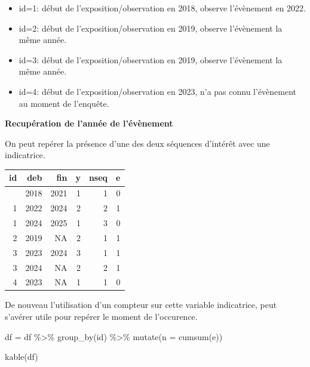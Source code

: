 \documentclass[
  12pt,
  letterpaper,
  DIV=11,
  numbers=noendperiod,
  onepage,
  openany]{scrreprt}
\newenvironment{Shaded}{\begin{snugshade}}{\end{snugshade}}
\newcommand{\AttributeTok}[1]{\textcolor[rgb]{0.80,0.80,0.80}{#1}}
\newcommand{\DecValTok}[1]{\textcolor[rgb]{0.86,0.86,0.80}{#1}}
\newcommand{\FunctionTok}[1]{\textcolor[rgb]{0.94,0.94,0.56}{#1}}
\newcommand{\NormalTok}[1]{\textcolor[rgb]{0.80,0.80,0.80}{#1}}
\newcommand{\OtherTok}[1]{\textcolor[rgb]{0.94,0.94,0.56}{#1}}
\newcommand{\SpecialCharTok}[1]{\textcolor[rgb]{0.86,0.64,0.64}{#1}}
\providecommand{\tightlist}{%
  \setlength{\itemsep}{0pt}\setlength{\parskip}{0pt}}\usepackage{longtable,booktabs,array}
\begin{document}
\begin{itemize}
\tightlist
\item
  id=1: début de l'exposition/observation en 2018, observe l'évènement
  en 2022.
\item
  id=2: début de l'exposition/observation en 2019, observe l'évènement
  la même année.
\item
  id=3: début de l'exposition/observation en 2019, observe l'évènement
  la même année.
\item
  id=4: début de l'exposition/observation en 2023, n'a pas connu
  l'évènement au moment de l'enquête.
\end{itemize}

\textbf{Recupération de l'année de l'évènement}

On peut repérer la présence d'une des deux séquences d'intérêt avec une
indicatrice.

\begin{Shaded}
\end{Shaded}

\begin{longtable}[]{@{}rrrrrr@{}}
\toprule\noalign{}
id & deb & fin & y & nseq & e \\
\midrule\noalign{}
\endhead
\bottomrule\noalign{}
\endlastfoot
1 & 2018 & 2021 & 1 & 1 & 0 \\
1 & 2022 & 2024 & 2 & 2 & 1 \\
1 & 2024 & 2025 & 1 & 3 & 0 \\
2 & 2019 & NA & 2 & 1 & 1 \\
3 & 2023 & 2024 & 3 & 1 & 1 \\
3 & 2024 & NA & 2 & 2 & 1 \\
4 & 2023 & NA & 1 & 1 & 0 \\
\end{longtable}

De nouveau l'utilisation d'un compteur sur cette variable indicatrice,
peut s'avérer utile pour repérer le moment de l'occurence.

\begin{Shaded}
\begin{Highlighting}[]
\NormalTok{df }\OtherTok{=}\NormalTok{ df }\SpecialCharTok{\%\textgreater{}\%} \FunctionTok{group\_by}\NormalTok{(id) }\SpecialCharTok{\%\textgreater{}\%} \FunctionTok{mutate}\NormalTok{(}\AttributeTok{n  =} \FunctionTok{cumsum}\NormalTok{(e)) }

\FunctionTok{kable}\NormalTok{(df)}
\end{Highlighting}
\end{Shaded}
\end{document}
